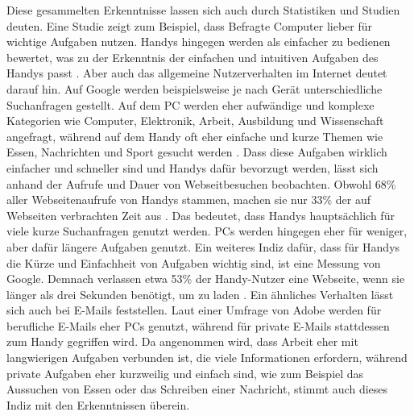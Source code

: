 \myNewSection
Diese gesammelten Erkenntnisse lassen sich auch durch Statistiken und Studien deuten. %
Eine Studie zeigt zum Beispiel, dass Befragte Computer lieber für wichtige Aufgaben nutzen. Handys hingegen werden als einfacher zu bedienen bewertet, was zu der Erkenntnis der einfachen und intuitiven Aufgaben des Handys passt \cite{pcVsphone_easyUseVsImportantTask}.\newline%
Aber auch das allgemeine Nutzerverhalten im Internet deutet darauf hin.
	Auf Google werden beispielsweise je nach Gerät unterschiedliche Suchanfragen gestellt. Auf dem PC werden eher aufwändige und komplexe Kategorien wie Computer, Elektronik, Arbeit, Ausbildung und Wissenschaft angefragt, während auf dem Handy oft eher einfache und kurze Themen wie Essen, Nachrichten und Sport gesucht werden \cite{pcVsphone_onWebsites_DevicesDistrubition_TimeSpent_Bouncrate_PageViews_Categories}.\newline%
		Dass diese Aufgaben wirklich einfacher und schneller sind und Handys dafür bevorzugt werden, lässt sich anhand der Aufrufe und Dauer von Webseitbesuchen beobachten. Obwohl 68\% aller Webseitenaufrufe von Handys stammen, machen sie nur 33\% der auf Webseiten verbrachten Zeit aus \cite{pcVsphone_onWebsites_DevicesDistrubition_TimeSpent_Bouncrate_PageViews_Categories}. Das bedeutet, dass Handys hauptsächlich für viele kurze Suchanfragen genutzt werden. PCs werden hingegen eher für weniger, aber dafür längere Aufgaben genutzt.\newline%
		Ein weiteres Indiz dafür, dass für Handys die Kürze und Einfachheit von Aufgaben wichtig sind, ist eine Messung von Google. Demnach verlassen etwa 53\% der Handy-Nutzer eine Webseite, wenn sie länger als drei Sekunden benötigt, um zu laden \cite{pcVsphone_threeSeconds}.\newline%
		Ein ähnliches Verhalten lässt sich auch bei E-Mails feststellen. Laut einer Umfrage von Adobe werden für berufliche E-Mails eher PCs genutzt, während für private E-Mails stattdessen zum Handy gegriffen wird\cite{pcVsphone_personalEmailsVsWorkEmails}. Da angenommen wird, dass Arbeit eher mit langwierigen Aufgaben verbunden ist, die viele Informationen erfordern, während private Aufgaben eher kurzweilig und einfach sind, wie zum Beispiel das Aussuchen von Essen oder das Schreiben einer Nachricht, stimmt auch dieses Indiz mit den Erkenntnissen überein.%
